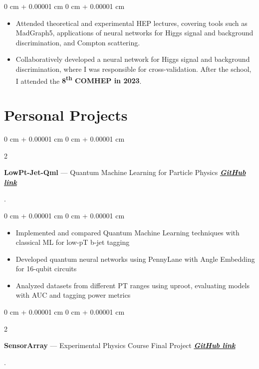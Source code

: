 \documentclass[10pt, letterpaper]{article}
\newenvironment{highlights}{
    \begin{itemize}[
        topsep=0.10 cm,
        parsep=0.10 cm,
        partopsep=0pt,
        itemsep=0pt,
        leftmargin=0 cm + 10pt
    ]
}{
    \end{itemize}
}
\newenvironment{onecolentry}{
    \begin{adjustwidth}{
        0 cm + 0.00001 cm
    }{
        0 cm + 0.00001 cm
    }
}{
    \end{adjustwidth}
}
\newenvironment{twocolentry}[2][]{
    \onecolentry
    \def\secondColumn{#2}
    \setcolumnwidth{\fill, 4.5 cm}
    \begin{paracol}{2}
}{
    \switchcolumn \raggedleft \secondColumn
    \end{paracol}
    \endonecolentry
}
\begin{document}
    \vspace{0.10 cm}
    \begin{onecolentry}
        \begin{highlights}
            \item Attended theoretical and experimental HEP lectures, covering tools such as MadGraph5, applications of neural networks for Higgs signal and background discrimination, and Compton scattering.
            \item Collaboratively developed a neural network for Higgs signal and background discrimination, where I was responsible for cross-validation. After the school, I attended the \textbf{8\textsuperscript{th} COMHEP in 2023}.
        \end{highlights}
    \end{onecolentry}

    \section{Personal Projects}

    \begin{twocolentry}{
        2025.
    }
        \textbf{LowPt-Jet-Qml} --- Quantum Machine Learning for Particle Physics \textbf{\textit{\href{https://github.com/JuanJ27/LowPt-Jet-Qml}{GitHub link}}}
    \end{twocolentry}

    \vspace{0.10 cm}
    \begin{onecolentry}
        \begin{highlights}
            \item Implemented and compared Quantum Machine Learning techniques with classical ML for low-pT b-jet tagging
            \item Developed quantum neural networks using PennyLane with Angle Embedding for 16-qubit circuits
            \item Analyzed datasets from different PT ranges using uproot, evaluating models with AUC and tagging power metrics
        \end{highlights}
    \end{onecolentry}

    \begin{twocolentry}{
        2025.
    }
        \textbf{SensorArray} --- Experimental Physics Course Final Project \textbf{\textit{\href{https://github.com/JuanJ27/SensorArray-for-laser-Lissajous-curves}{GitHub link}}}
    \end{twocolentry}
\end{document}
